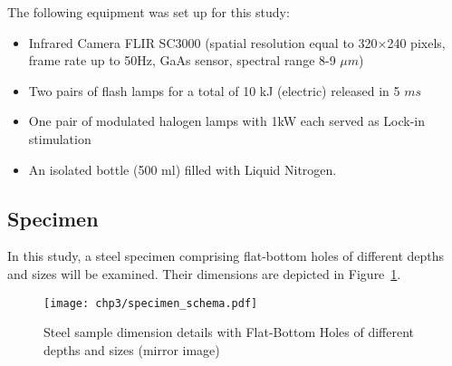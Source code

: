 
The following equipment was set up for this study:
\begin{itemize}
   \item Infrared Camera FLIR SC3000 (spatial resolution equal to 320$\times$240 pixels, frame rate up to 50Hz, GaAs sensor, spectral range 8-9 $\mu m$)
   \item Two pairs of flash 
    lamps for a total of 10 kJ (electric) released in 5 $ms$ 
   \item One pair of modulated halogen lamps with 1kW each served as Lock-in stimulation
   \item An isolated bottle (500 ml)
filled with
   Liquid Nitrogen.
\end{itemize}

\subsection{Specimen} %
\label{sub:specimen}
In this study, a steel specimen comprising flat-bottom holes of different depths and sizes will be examined. Their dimensions are depicted in Figure~\ref{specimen}.
   \begin{figure}[ht]
   \centering   
   \texttt{[image: chp3/specimen\_schema.pdf]}
   \caption{Steel sample dimension details with Flat-Bottom Holes of different depths and sizes (mirror image)} 
    \label{specimen} 
   \end{figure}  

